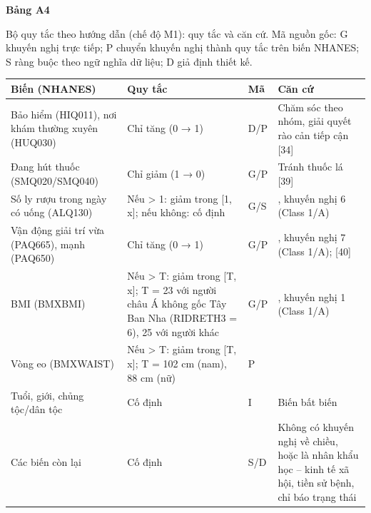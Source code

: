\documentclass[9pt,a4paper]{extarticle}
\newcommand{\tabcap}[2]{{\footnotesize\textbf{Bảng #1}\par\vspace{1pt}#2\par}\vspace{3pt}\scriptsize}
\newcommand{\tabnote}[1]{\par\vspace{2pt}{\scriptsize\raggedright #1\par}}
\begin{document}
\begin{table}[h!]
\tabcap{A4}{Bộ quy tắc theo hướng dẫn (chế độ M1): quy tắc và căn cứ. Mã nguồn gốc: G khuyến nghị trực tiếp; P chuyển khuyến nghị thành quy tắc trên biến NHANES; S ràng buộc theo ngữ nghĩa dữ liệu; D giả định thiết kế.}
\begin{tabularx}{\columnwidth}{>{\raggedright\arraybackslash}X>{\raggedright\arraybackslash}X>{\raggedright\arraybackslash}X>{\raggedright\arraybackslash}X}
\toprule
\textbf{Biến (NHANES)} & \textbf{Quy tắc} & \textbf{Mã} & \textbf{Căn cứ} \\ \midrule
Bảo hiểm (HIQ011), nơi khám thường xuyên (HUQ030) & Chỉ tăng (0 → 1) & D/P & Chăm sóc theo nhóm, giải quyết rào cản tiếp cận [34] \\
Đang hút thuốc (SMQ020/SMQ040) & Chỉ giảm (1 → 0) & G/P & Tránh thuốc lá [39] \\
Số ly rượu trong ngày có uống (ALQ130) & Nếu > 1: giảm trong [1, x]; nếu không: cố định & G/S & [34], khuyến nghị 6 (Class 1/A) \\
Vận động giải trí vừa (PAQ665), mạnh (PAQ650) & Chỉ tăng (0 → 1) & G/P & [34], khuyến nghị 7 (Class 1/A); [40] \\
BMI (BMXBMI) & Nếu > T: giảm trong [T, x]; T = 23 với người châu Á không gốc Tây Ban Nha (RIDRETH3 = 6), 25 với người khác & G/P & [34], khuyến nghị 1 (Class 1/A) \\
Vòng eo (BMXWAIST) & Nếu > T: giảm trong [T, x]; T = 102 cm (nam), 88 cm (nữ) & P & [35,36] \\
Tuổi, giới, chủng tộc/dân tộc & Cố định & I & Biến bất biến \\
Các biến còn lại & Cố định & S/D & Không có khuyến nghị về chiều, hoặc là nhân khẩu học – kinh tế xã hội, tiền sử bệnh, chỉ báo trạng thái \\
\bottomrule
\end{tabularx}
\tabnote{Mã I: biến bất biến (tuổi, giới, chủng tộc/dân tộc). Mọi khoảng còn bị giới hạn trong miền giá trị của tập huấn luyện. Biến bị thiếu dữ liệu rồi được điền thay được cố định cho người đó, chỉ ở M1 và M3. M3 thêm giới hạn BMI và vòng eo giảm tối đa 5\% (cận dưới max(T; 0,95x)); mức 5\% cho BMI dựa trên mục tiêu giảm cân tối thiểu của hướng dẫn, còn mức 5\% cho vòng eo là giả định thiết kế (D). Giới hạn: ngưỡng BMI 23/25 là ngưỡng vận hành lấy từ ranh giới phân loại, không phải mục tiêu điều trị; ngưỡng vòng eo 102/88 cm là ngưỡng xác định béo bụng theo chuẩn Mỹ, áp dụng chung cho mọi nhóm dân số, khác với ngưỡng BMI theo nhóm dân số; quy tắc cho ALQ130 không mô phỏng việc bỏ rượu hoàn toàn; biến vận động là nhị phân nên 0 → 1 không có nghĩa là đạt liều vận động khuyến nghị; BMI và vòng eo được thay đổi độc lập nên không bảo đảm nhất quán sinh lý; tiền sử gia đình, natri, kali, chế độ ăn DASH và quản lý căng thẳng không có trong tập biến.}
\end{table}
\end{document}
